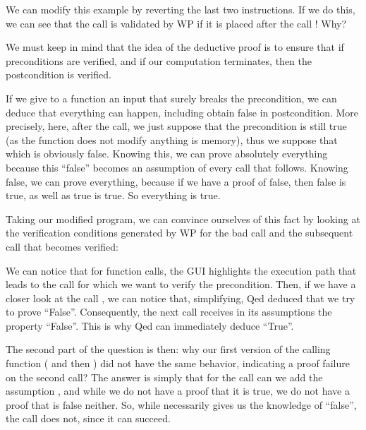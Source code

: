 

We can modify this example by reverting the last two instructions. If we
do this, we can see that the call  is validated by WP if
it is placed after the call ! Why?



We must keep in mind that the idea of the deductive proof is to ensure
that if preconditions are verified, and if our computation terminates,
then the postcondition is verified.



If we give to a function an input that surely breaks the precondition, we can
deduce that everything can happen, including obtain false in postcondition.
More precisely, here, after the call, we just suppose that the precondition
is still true (as the function does not modify anything is memory), thus we
suppose that  which is obviously false.
Knowing this, we can prove absolutely everything because this ``false'' becomes
an assumption of every call that follows. Knowing false, we can prove everything,
because if we have a proof of false, then false is true, as well as true is true.
So everything is true.



Taking our modified program, we can convince ourselves of this fact by
looking at the verification conditions generated by WP for the bad call and the
subsequent call that becomes verified:







We can notice that for function calls, the GUI highlights the execution
path that leads to the call for which we want to verify the precondition.
Then, if we have a closer look at the call , we
can notice that, simplifying, Qed deduced that we try to prove
``False''. Consequently, the next call  receives in its
assumptions the property ``False''. This is why Qed can immediately
deduce ``True''.



The second part of the question is then: why our first version of the
calling function ( and then ) did
not have the same behavior, indicating a proof failure on the second
call? The answer is simply that for the call  can we add
the assumption , and while we do not have a proof
that it is true, we do not have a proof that is false neither. So, while
 necessarily gives us the knowledge of ``false'',
the call  does not, since it can succeed.




